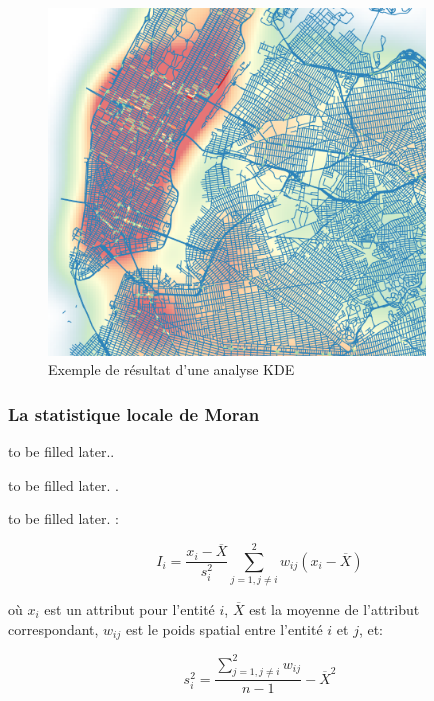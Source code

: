 \medskip


\begin{figure}[hbt!]
  \centering
  \includegraphics[width=10cm]{images_pfe/KDE_result.png}
  \caption{Exemple de résultat d'une analyse KDE \parencite{romano_visualizing_2017}}
  \label{fig:kde-result}
\end{figure}
\FloatBarrier

\medskip

\subsubsection{La statistique locale de Moran}to be filled later.\parencite{hart_kernel_2014}. 

\medskip
to be filled later. \parencite{chang_introduction_2019}.

\medskip
to be filled later. \parencite{hart_kernel_2014} :

\medskip

\begin{equation}
    I_i = \frac{x_i - \overline{X}}{ s_i^{2}} \sum_{j=1,j\neq i}^2 w_{ij}  (x_i - \overline{X})
\end{equation}

\medskip

où $x_i$ est un attribut pour l'entité $i$,  $\overline{X}$ est la moyenne de l'attribut correspondant, $w_{ij}$ est le poids spatial entre l'entité $i$ et $j$, et:

\medskip

\begin{equation}
    s_i^2 = \frac{\sum_{j=1,j\neq i}^2 w_{ij}  }{n-1} - \overline{X}^2
\end{equation}

